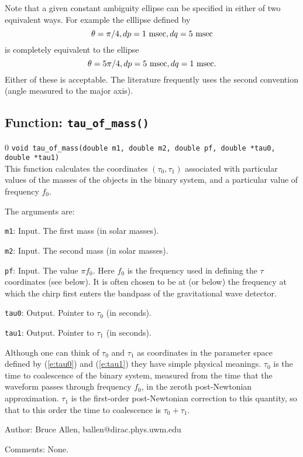 Note that a given constant ambiguity ellipse can be specified in either of two
equivalent ways.  For example the elllipse
defined by
\begin{equation}
\theta = \pi/4, dp=1 {\rm \ msec}, dq=5 {\rm \ msec}
\end{equation}
is completely equivalent to the ellipse
\begin{equation}
\theta = 5 \pi/4, dp=5 {\rm \ msec}, dq=1 {\rm \ msec}.
\end{equation}
Either of these is acceptable.  The literature frequently uses the second convention (angle measured to the
major axis).

\clearpage
\subsection{Function: {\tt  tau\_of\_mass()}}
\label{ss:tau_of_mass}
\setcounter{equation}0
{\tt void tau\_of\_mass(double m1, double m2, double pf, double *tau0, double *tau1)}\\
This function calculates the coordinates $(\tau_0,\tau_1)$ associated
with particular values of the masses of the objects in the binary system, and a particular
value of frequency $f_0$.

The arguments are:
\begin{description}
\item{\tt m1}: Input.  The first mass (in solar masses).
\item{\tt m2}: Input.  The second mass (in solar masses).
\item{\tt pf}: Input.  The value $\pi f_0$. Here $f_0$ is the frequency
  used in defining the $\tau$ coordinates (see below).  It is often
  chosen to be at (or below) the frequency at which the chirp first
  enters the bandpass of the gravitational wave detector.
\item{\tt tau0}: Output.  Pointer to $\tau_0$ (in seconds).
\item{\tt tau1}: Output.  Pointer to $\tau_1$ (in seconds).
\end{description}

Although one can think of $\tau_0$ and $\tau_1$ as coordinates in the
parameter space defined by (\ref{e:tau0}) and (\ref{e:tau1}) they have
simple physical meanings.  $\tau_0$ is the time to coalescence of the
binary system, measured from the time that the waveform passes through
frequency $f_0$, in the zeroth post-Newtonian approximation.  $\tau_1$
is the first-order post-Newtonian correction to this quantity, so that
to this order the time to coalescence is $\tau_0+\tau_1$.
\begin{description}
\item{Author:}
Bruce Allen, ballen@dirac.phys.uwm.edu
\item{Comments:}
None.
\end{description}
\clearpage

